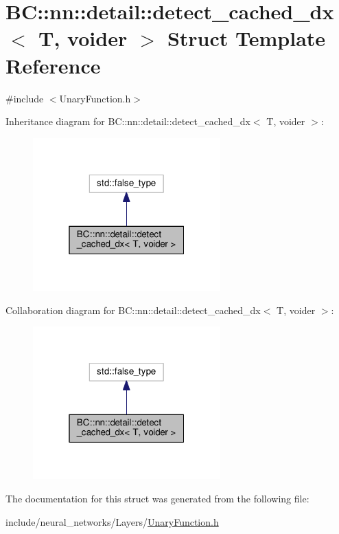 \hypertarget{structBC_1_1nn_1_1detail_1_1detect__cached__dx}{}\section{BC\+:\+:nn\+:\+:detail\+:\+:detect\+\_\+cached\+\_\+dx$<$ T, voider $>$ Struct Template Reference}
\label{structBC_1_1nn_1_1detail_1_1detect__cached__dx}


{\ttfamily \#include $<$Unary\+Function.\+h$>$}



Inheritance diagram for BC\+:\+:nn\+:\+:detail\+:\+:detect\+\_\+cached\+\_\+dx$<$ T, voider $>$\+:
\nopagebreak
\begin{figure}[H]
\begin{center}
\leavevmode
\includegraphics[width=205pt]{structBC_1_1nn_1_1detail_1_1detect__cached__dx__inherit__graph}
\end{center}
\end{figure}


Collaboration diagram for BC\+:\+:nn\+:\+:detail\+:\+:detect\+\_\+cached\+\_\+dx$<$ T, voider $>$\+:
\nopagebreak
\begin{figure}[H]
\begin{center}
\leavevmode
\includegraphics[width=205pt]{structBC_1_1nn_1_1detail_1_1detect__cached__dx__coll__graph}
\end{center}
\end{figure}


The documentation for this struct was generated from the following file\+:\begin{DoxyCompactItemize}
\item 
include/neural\+\_\+networks/\+Layers/\hyperlink{UnaryFunction_8h}{Unary\+Function.\+h}\end{DoxyCompactItemize}
